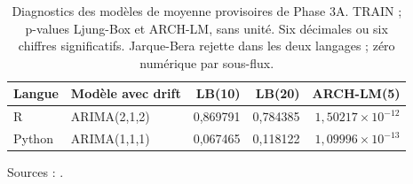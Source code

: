 \begin{table}[!htbp]
\centering
\caption{Diagnostics des modèles de moyenne provisoires de Phase 3A. TRAIN ; p-values Ljung-Box et ARCH-LM, sans unité. Six décimales ou six chiffres significatifs. Jarque-Bera rejette dans les deux langages ; zéro numérique par sous-flux.}
\label{tab:arima_diagnostics}
\small
\setlength{\tabcolsep}{4pt}
\renewcommand{\arraystretch}{1.16}
\begin{tabularx}{\linewidth}{lXrrr}
\toprule
\textbf{Langue} & \textbf{Modèle avec drift} & \textbf{LB(10)} & \textbf{LB(20)} & \textbf{ARCH-LM(5)} \\
\midrule
R & ARIMA(2,1,2) & 0,869791 & 0,784385 & \(1{,}50217\times 10^{-12}\) \\
Python & ARIMA(1,1,1) & 0,067465 & 0,118122 & \(1{,}09996\times 10^{-13}\) \\
\bottomrule
\end{tabularx}
\par\smallskip
\begin{minipage}{\linewidth}\footnotesize Sources : .
\end{minipage}
\end{table}
